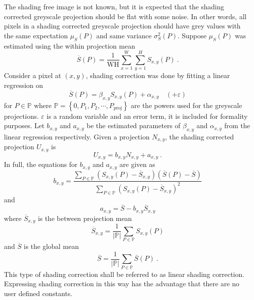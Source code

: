 The shading free image is not known, but it is expected that the shading corrected greyscale projection should be flat with some noise. In other words, all pixels in a shading corrected greyscale projection should have grey values with the same expectation $\mu_{S}(P)$ and same variance $\sigma_{S}^2(P)$. Suppose $\mu_{S}(P)$ was estimated using the within projection mean
\begin{equation}
\overline{S}(P) = \dfrac{1}{\text{WH}}
\sum_{x=1}^W\sum_{y=1}^H S_{x,y}(P) \ .
\end{equation}
Consider a pixel at $(x,y)$, shading correction was done by fitting a linear regression on
\begin{equation}
\overline{S}(P) = \beta_{x,y} S_{x,y}(P) + \alpha_{x,y} \quad(+\varepsilon)
\end{equation}
for $P\in \mathbb{P}$ where $\mathbb{P} = \left\{0,P_1,P_2,\cdots, P_\text{proj}\right\}$ are the powers used for the greyscale projections. $\varepsilon$ is a random variable and an error term, it is included for formality purposes. Let $b_{x,y}$ and $a_{x,y}$ be the estimated parameters of $\beta_{x,y}$ and $\alpha_{x,y}$ from the linear regression respectively. Given a projection $N_{x,y}$, the shading corrected projection $U_{x,y}$ is
\begin{equation}
U_{x,y} = b_{x,y} N_{x,y} + a_{x,y} \ .
\end{equation}
In full, the equations for $b_{x,y}$ and $a_{x,y}$ are given as
\begin{equation}
b_{x,y} = \dfrac{
  \sum_{P\in\mathbb{P}}(S_{x,y}(P) - \overline{S}_{x,y})(\overline{S}(P) - \overline{S})
}{
  \sum_{P\in\mathbb{P}}(S_{x,y}(P) - \overline{S}_{x,y})^2
}
\end{equation}
and
\begin{equation}
a_{x,y} = \overline{S} - b_{x,y}\overline{S}_{x,y}
\end{equation}
where $\overline{S}_{x,y}$ is the between projection mean
\begin{equation}
\overline{S}_{x,y} = \dfrac{1}{|\mathbb{P}|}\sum_{P\in\mathbb{P}}S_{x,y}(P)
\end{equation}
and $\overline{S}$ is the global mean
\begin{equation}
\overline{S} = \dfrac{1}{|\mathbb{P}|}\sum_{P\in\mathbb{P}}\overline{S}(P) \ .
\end{equation}
This type of shading correction shall be referred to as linear shading correction. Expressing shading correction in this way has the advantage that there are no user defined constants.

